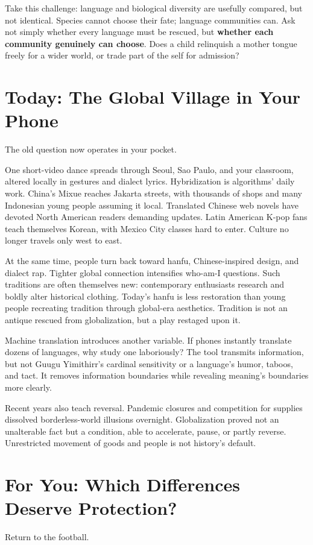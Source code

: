Take this challenge: language and biological diversity are usefully compared, but not identical. Species cannot choose their fate; language communities can. Ask not simply whether every language must be rescued, but \textbf{whether each community genuinely can choose}. Does a child relinquish a mother tongue freely for a wider world, or trade part of the self for admission?

\section{Today: The Global Village in Your Phone}
The old question now operates in your pocket.

One short-video dance spreads through Seoul, Sao Paulo, and your classroom, altered locally in gestures and dialect lyrics. Hybridization is algorithms' daily work. China's Mixue reaches Jakarta streets, with thousands of shops and many Indonesian young people assuming it local. Translated Chinese web novels have devoted North American readers demanding updates. Latin American K-pop fans teach themselves Korean, with Mexico City classes hard to enter. Culture no longer travels only west to east.

At the same time, people turn back toward hanfu, Chinese-inspired design, and dialect rap. Tighter global connection intensifies who-am-I questions. Such traditions are often themselves new: contemporary enthusiasts research and boldly alter historical clothing. Today's hanfu is less restoration than young people recreating tradition through global-era aesthetics. Tradition is not an antique rescued from globalization, but a play restaged upon it.

Machine translation introduces another variable. If phones instantly translate dozens of languages, why study one laboriously? The tool transmits information, but not Guugu Yimithirr's cardinal sensitivity or a language's humor, taboos, and tact. It removes information boundaries while revealing meaning's boundaries more clearly.

Recent years also teach reversal. Pandemic closures and competition for supplies dissolved borderless-world illusions overnight. Globalization proved not an unalterable fact but a condition, able to accelerate, pause, or partly reverse. Unrestricted movement of goods and people is not history's default.

\section[Which Differences Deserve Protection?]{For You: Which Differences Deserve Protection?}
Return to the football.


